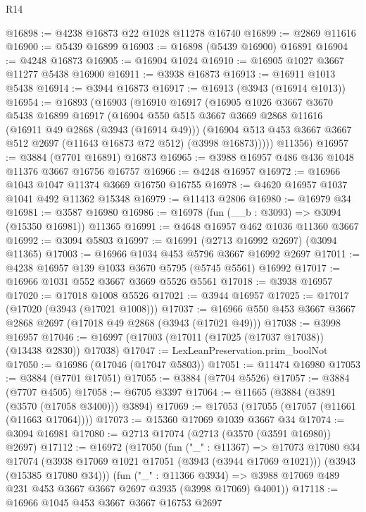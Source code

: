 \begin{lexlean}{R14}
\begin{coremodule}
@16898 := @4238 @16873 @22 @1028 @11278 @16740
@16899 := @2869 @11616
@16900 := @5439 @16899
@16903 := @16898 (@5439 @16900) @16891
@16904 := @4248 @16873
@16905 := @16904 @1024
@16910 := @16905 @1027 @3667 @11277 @5438 @16900
@16911 := @3938 @16873
@16913 := @16911 @1013 @5438
@16914 := @3944 @16873
@16917 := @16913 (@3943 (@16914 @1013))
@16954 := @16893
    (@16903
      (@16910
        @16917
        (@16905
          @1026
          @3667
          @3670
          @5438
          @16899
          @16917
          (@16904
            @550
            @515
            @3667
            @3669
            @2868
            @11616
            (@16911 @49 @2868 (@3943 (@16914 @49)))
            (@16904 @513 @453 @3667 @3667 @512 @2697 (@11643 @16873 @72 @512) (@3998 @16873)))))
      @11356)
@16957 := @3884 (@7701 @16891) @16873
@16965 := @3988 @16957 @486 @436 @1048 @11376 @3667 @16756 @16757
@16966 := @4248 @16957
@16972 := @16966 @1043 @1047 @11374 @3669 @16750 @16755
@16978 := @4620 @16957 @1037 @1041 @492 @11362 @15348
@16979 := @11413 @2806
@16980 := @16979 @34
@16981 := @3587 @16980
@16986 := @16978 (fun (__b : @3093) => @3094 (@15350 @16981)) @11365
@16991 := @4648 @16957 @462 @1036 @11360 @3667
@16992 := @3094 @5803
@16997 := @16991 (@2713 @16992 @2697) (@3094 @11365)
@17003 := @16966 @1034 @453 @5796 @3667 @16992 @2697
@17011 := @4238 @16957 @139 @1033 @3670 @5795 (@5745 @5561) @16992
@17017 := @16966 @1031 @552 @3667 @3669 @5526 @5561
@17018 := @3938 @16957
@17020 := @17018 @1008 @5526
@17021 := @3944 @16957
@17025 := @17017 (@17020 (@3943 (@17021 @1008)))
@17037 := @16966 @550 @453 @3667 @3667 @2868 @2697 (@17018 @49 @2868 (@3943 (@17021 @49)))
@17038 := @3998 @16957
@17046 := @16997 (@17003 (@17011 (@17025 (@17037 @17038)) (@13438 @2830)) @17038)
@17047 := LexLeanPreservation.prim_boolNot
@17050 := @16986 (@17046 (@17047 @5803))
@17051 := @11474 @16980
@17053 := @3884 (@7701 @17051)
@17055 := @3884 (@7704 @5526)
@17057 := @3884 (@7707 @4505)
@17058 := @6705 @3397
@17064 := @11665 (@3884 (@3891 (@3570 (@17058 @3400))) @3894)
@17069 := @17053 (@17055 (@17057 (@11661 (@11663 @17064))))
@17073 := @15360 @17069 @1039 @3667 @34
@17074 := @3094 @16981
@17080 := @2713 @17074 (@2713 (@3570 (@3591 @16980)) @2697)
@17112 := @16972
    (@17050
      (fun ("_" : @11367) =>
      @17073
        @17080
        @34
        @17074
        (@3938 @17069 @1021 @17051 (@3943 (@3944 @17069 @1021)))
        (@3943 (@15385 @17080 @34)))
      (fun ("_" : @11366 @3934) =>
      @3988 @17069 @489 @231 @453 @3667 @3667 @2697 @3935 (@3998 @17069) @4001))
@17118 := @16966 @1045 @453 @3667 @3667 @16753 @2697

\end{coremodule}
\end{lexlean}
